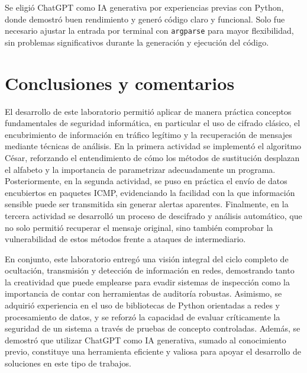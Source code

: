 \documentclass[letter,12pt]{article}
\begin{document}
Se eligió ChatGPT como IA generativa por experiencias previas con Python, donde demostró buen rendimiento y generó código claro y funcional. Solo fue necesario ajustar la entrada por terminal con \verb|argparse| para mayor flexibilidad, sin problemas significativos durante la generación y ejecución del código.

\section*{Conclusiones y comentarios}
\label{conclusiones}
El desarrollo de este laboratorio permitió aplicar de manera práctica conceptos fundamentales de seguridad informática, en particular el uso de cifrado clásico, el encubrimiento de información en tráfico legítimo y la recuperación de mensajes mediante técnicas de análisis. En la primera actividad se implementó el algoritmo César, reforzando el entendimiento de cómo los métodos de sustitución desplazan el alfabeto y la importancia de parametrizar adecuadamente un programa. Posteriormente, en la segunda actividad, se puso en práctica el envío de datos encubiertos en paquetes ICMP, evidenciando la facilidad con la que información sensible puede ser transmitida sin generar alertas aparentes. Finalmente, en la tercera actividad se desarrolló un proceso de descifrado y análisis automático, que no solo permitió recuperar el mensaje original, sino también comprobar la vulnerabilidad de estos métodos frente a ataques de intermediario.

En conjunto, este laboratorio entregó una visión integral del ciclo completo de ocultación, transmisión y detección de información en redes, demostrando tanto la creatividad que puede emplearse para evadir sistemas de inspección como la importancia de contar con herramientas de auditoría robustas. Asimismo, se adquirió experiencia en el uso de bibliotecas de Python orientadas a redes y procesamiento de datos, y se reforzó la capacidad de evaluar críticamente la seguridad de un sistema a través de pruebas de concepto controladas. Además, se demostró que utilizar ChatGPT como IA generativa, sumado al conocimiento previo, constituye una herramienta eficiente y valiosa para apoyar el desarrollo de soluciones en este tipo de trabajos.
\end{document}
